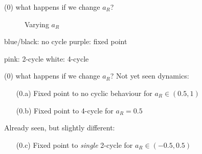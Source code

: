 \documentclass{beamer}
\newcounter{n}
\newcounter{f}
\begin{document}
\begin{frame}{(0) what happens if we change $a_R$?}
    \begin{figure}
        \centering
         \qquad
        \caption{Varying $a_R$}
    \end{figure}
    
    \hspace*{\fill}
    blue/black: no cycle
    \hspace*{\fill}
    purple: fixed point
    \hspace*{\fill}

    \hspace*{\fill}
    pink: 2-cycle
    \hspace*{\fill}
    white: 4-cycle
    \hspace*{\fill}
\end{frame}

\begin{frame}{(0) what happens if we change $a_R$?}
    Not yet seen dynamics:
    \begin{enumerate}
        \item[(0.a)] Fixed point to no cyclic behaviour for $a_R \in (0.5, 1)$
        \item[(0.b)] Fixed point to 4-cycle for $a_R = 0.5$
    \end{enumerate}

    \vspace*{2em}
    Already seen, but slightly different:
    \begin{enumerate}
        \item[(0.c)] Fixed point to \textit{single} 2-cycle for $a_R \in (-0.5, 0.5)$
    \end{enumerate}
\end{frame}
\end{document}
